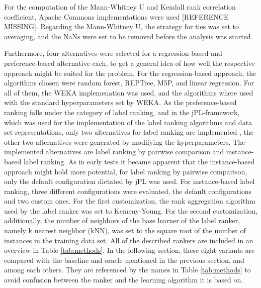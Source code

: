 For the computation of the Mann-Whitney U and Kendall rank correlation coefficient, Apache Commons implementations were used [REFERENCE MISSING]. Regarding the Mann-Whitney U, the strategy for ties was set to averaging, and the NaNs were set to be removed before the analysis was started.

Furthermore, four alternatives were selected for a regression-based and preference-based alternative each, to get a general idea of how well the respective approach might be suited for the problem. For the regression-based approach, the algorithms chosen were random forest, REPTree, M5P, and linear regression. For all of them, the WEKA implemenation \cite{hall2009weka} was used, and the algorithms where used with the standard hyperparameters set by WEKA. As the preference-based ranking falls under the category of label ranking, and in the jPL-framework, which was used for the implementation of the label ranking algorithms and data set representations, only two alternatives for label ranking are implemented \cite{intelligent2017jpl}, the other two alternatives were generated by modifying the hyperparameters. The implemented alternatives are label ranking by pairwise comparison and instance-based label ranking. As in early tests it became apparent that the instance-based approach might hold more potential, for label ranking by pairwise comparison, only the default configuration dictated by jPL was used. For instance-based label ranking, three different configurations were evaluated, the default configurations and two custom ones. For the first customization, the rank aggregation algorithm used by the label ranker was set to Kemeny-Young. For the second customization, additionally, the number of neighbors of the base learner of the label ranker, namely k nearest neighbor (kNN), was set to the square root of the number of instances in the training data set. All of the described rankers are included in an overview in Table \ref{tab:methods}. In the following section, these eight variants are compared with the baseline and oracle mentioned in the previous section, and among each others. They are referenced by the names in Table \ref{tab:methods} to avoid confusion between the ranker and the learning algorithm it is based on.

